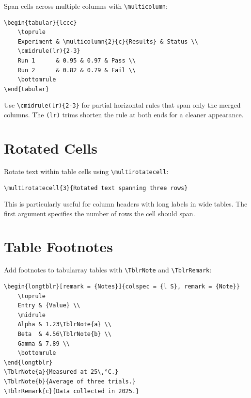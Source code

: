 Span cells across multiple columns with \verb|\multicolumn|:

\begin{verbatim}
\begin{tabular}{lccc}
    \toprule
    Experiment & \multicolumn{2}{c}{Results} & Status \\
    \cmidrule(lr){2-3}
    Run 1      & 0.95 & 0.97 & Pass \\
    Run 2      & 0.82 & 0.79 & Fail \\
    \bottomrule
\end{tabular}
\end{verbatim}

Use \verb|\cmidrule(lr){2-3}| for partial horizontal rules that span only the
merged columns. The \texttt{(lr)} trims shorten the rule at both ends for a
cleaner appearance.

\section{Rotated Cells}

Rotate text within table cells using \verb|\multirotatecell|:

\begin{verbatim}
\multirotatecell{3}{Rotated text spanning three rows}
\end{verbatim}

This is particularly useful for column headers with long labels in wide
tables. The first argument specifies the number of rows the cell should span.

\section{Table Footnotes}

Add footnotes to tabularray tables with \verb|\TblrNote| and
\verb|\TblrRemark|:

\begin{verbatim}
\begin{longtblr}[remark = {Notes}]{colspec = {l S}, remark = {Note}}
    \toprule
    Entry & {Value} \\
    \midrule
    Alpha & 1.23\TblrNote{a} \\
    Beta  & 4.56\TblrNote{b} \\
    Gamma & 7.89 \\
    \bottomrule
\end{longtblr}
\TblrNote{a}{Measured at 25\,°C.}
\TblrNote{b}{Average of three trials.}
\TblrRemark{c}{Data collected in 2025.}
\end{verbatim}

